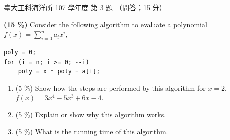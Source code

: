 \begin{pastexam}[label={px:ntu-107-esoe-ds-03}]{臺大工科海洋所 107 學年度 第 3 題}
（問答；15 分）

\textbf{(15 \%)} Consider the following algorithm to evaluate a polynomial
$f(x)=\sum_{i=0}^{n} a_i x^i$,
\begin{verbatim}
poly = 0;
for (i = n; i >= 0; --i)
    poly = x * poly + a[i];
\end{verbatim}
\begin{enumerate}[label=\alph*.]
\item (5 \%) Show how the steps are performed by this algorithm for $x=2$, $f(x)=3x^4-5x^3+6x-4$.
\item (5 \%) Explain or show why this algorithm works.
\item (5 \%) What is the running time of this algorithm.
\end{enumerate}
\end{pastexam}


